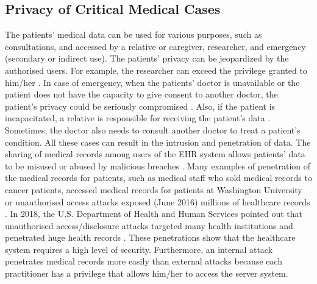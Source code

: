 \documentclass[journal,article,submit,moreauthors,pdftex]{Definitions/mdpi}
\begin{document}
\subsection{Privacy of Critical Medical Cases}
The patients' medical data can be used for various purposes, such as consultations, and
accessed by a relative or caregiver, researcher, and emergency (secondary or indirect use).
The patients' privacy can be jeopardized by the authorised users. For example, the
researcher can exceed the privilege granted to him/her \cite{fp8}.
In case of emergency, when the patients' doctor is unavailable or the patient does not have the
capacity to give consent to another doctor, the patient's privacy could be seriously compromised \cite{fp13}.
Also, if the patient is incapacitated, a relative is responsible for receiving the patient's data \cite{fp14}. Sometimes, the doctor also needs to consult another doctor to treat a patient's condition. All these cases can result in the intrusion and penetration of data. The sharing of medical records
among users of the EHR system allows patients' data to be misused or abused by malicious breaches \cite{fp9}. Many examples of penetration of the medical records for patients, such as medical staff who sold medical records to cancer patients, accessed medical records for patients at Washington University \cite{fp11} or unauthorised access attacks exposed (June 2016) millions of healthcare records \cite{fp34}. In 2018, the U.S. Department of Health and Human Services pointed out that unauthorised access/disclosure attacks targeted many health institutions and penetrated huge health records \cite{fp33}. These penetrations show that the healthcare system requires a high level of security. Furthermore, an internal attack penetrates medical records more easily than external attacks because each practitioner has a privilege that allows him/her to access the server system.
\end{document}
